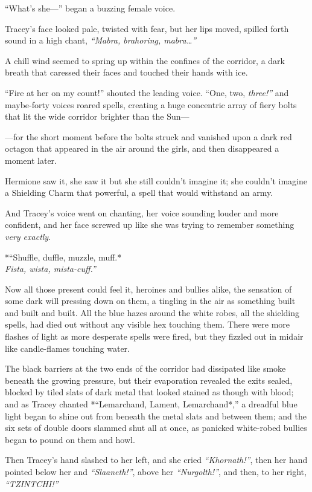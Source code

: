 ``What's she---'' began a buzzing female voice.

Tracey's face looked pale, twisted with fear, but her lips moved,
spilled forth sound in a high chant, \emph{``Mabra, brahoring,
mabra\ldots{}''}

A chill wind seemed to spring up within the confines of the corridor, a
dark breath that caressed their faces and touched their hands with ice.

``Fire at her on my count!'' shouted the leading voice. ``One, two,
\emph{three!''} and maybe-forty voices roared spells, creating a huge
concentric array of fiery bolts that lit the wide corridor brighter than
the Sun---

---for the short moment before the bolts struck and vanished upon a dark
red octagon that appeared in the air around the girls, and then
disappeared a moment later.

Hermione saw it, she saw it but she still couldn't imagine it; she
couldn't imagine a Shielding Charm that powerful, a spell that would
withstand an army.

And Tracey's voice went on chanting, her voice sounding louder and more
confident, and her face screwed up like she was trying to remember
something \emph{very exactly}.

*``Shuffle, duffle, muzzle, muff.*\\\emph{Fista, wista, mista-cuff.''}

Now all those present could feel it, heroines and bullies alike, the
sensation of some dark will pressing down on them, a tingling in the air
as something built and built and built. All the blue hazes around the
white robes, all the shielding spells, had died out without any visible
hex touching them. There were more flashes of light as more desperate
spells were fired, but they fizzled out in midair like candle-flames
touching water.

The black barriers at the two ends of the corridor had dissipated like
smoke beneath the growing pressure, but their evaporation revealed the
exits sealed, blocked by tiled slats of dark metal that looked stained
as though with blood; and as Tracey chanted *``Lemarchand, Lament,
Lemarchand*,'' a dreadful blue light began to shine out from beneath the
metal slats and between them; and the six sets of double doors slammed
shut all at once, as panicked white-robed bullies began to pound on them
and howl.

Then Tracey's hand slashed to her left, and she cried
\emph{``Khornath!''}, then her hand pointed below her and
\emph{``Slaaneth!''}, above her \emph{``Nurgolth!''}, and then, to her
right, \emph{``TZINTCHI!''}

